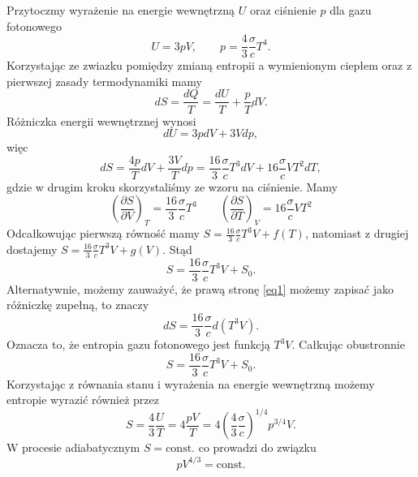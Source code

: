 \documentclass[11pt,a4paper]{article}
\newcommand{\Partial}[3]{\left( \frac{\partial #1}{\partial #2} \right)_{#3}}
\begin{document}
Przytoczmy wyrażenie na energie wewnętrzną $U$ oraz ciśnienie $p$ dla gazu fotonowego
\begin{equation}
	U = 3 p V, \qquad p = \frac{4}{3} \frac{\sigma}{c} T^4.
\end{equation}
Korzystając ze zwiazku pomiędzy zmianą entropii a wymienionym ciepłem oraz z pierwszej zasady termodynamiki mamy
\begin{equation}
	dS = \frac{dQ}{T} = \frac{dU}{T} + \frac{p}{T} dV.
\end{equation}
Różniczka energii wewnętrznej wynosi 
\begin{equation}
	dU = 3p dV + 3 V dp,
\end{equation}
więc
\begin{equation}
\label{eq1}
	dS = \frac{4p }{T} dV + \frac{3 V}{T} dp = \frac{16}{3} \frac{\sigma}{c} T^3 dV + 16 \frac{\sigma }{c} V T^2 dT,
\end{equation}
gdzie w drugim kroku skorzystaliśmy ze wzoru na ciśnienie.
Mamy
\begin{equation}
    \Partial{S}{V}{T}=\frac{16}{3} \frac{\sigma}{c}T^3 \qquad \Partial{S}{T}{V}=16 \frac{\sigma}{c}V T^2
\end{equation}
Odcałkowując pierwszą równość mamy $S = \frac{16}{3} \frac{\sigma}{c} T^3 V +f(T)$, natomiast z drugiej dostajemy $S = \frac{16}{3} \frac{\sigma}{c} T^3 V +g(V)$. Stąd 
\begin{equation}
	S = \frac{16}{3} \frac{\sigma }{c} T^3 V + S_0.
\end{equation}
Alternatywnie, możemy zauważyć, że prawą stronę \eqref{eq1} możemy zapisać jako różniczkę zupełną, to znaczy
\begin{equation}
	dS = \frac{16}{3} \frac{\sigma }{c}   d \left(T^3 V\right).
\end{equation}
Oznacza to, że entropia gazu fotonowego jest funkcją $T^3 V$. Całkując obustronnie
\begin{equation}
	S = \frac{16}{3} \frac{\sigma }{c} T^3 V + S_0.
\end{equation}
Korzystając z równania stanu i wyrażenia na energie wewnętrzną możemy entropie wyrazić również przez
\begin{equation}
	S = \frac{4}{3} \frac{U}{T} = 4 \frac{p V}{T}=4\left( \frac{4}{3} \frac{\sigma}{c} \right)^{1/4}p^{3/4}V.
\end{equation}
W procesie adiabatycznym $S=\text{const.}$ co prowadzi do związku
\begin{equation}
    pV^{4/3}=\text{const.}
\end{equation}
\end{document}
